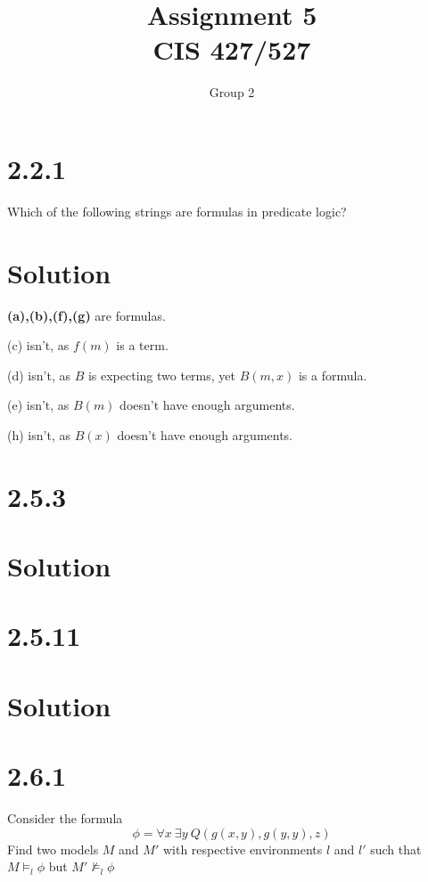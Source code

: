 \documentclass[10pt]{article}
\begin{document}
\title{Assignment \raisebox{.22ex}{\large\#}5 \\
	CIS 427/527}
\author{Group 2}

\maketitle

\section*{2.2.1}
Which of the following strings are formulas in predicate logic?
\section*{Solution}
\textbf{(a),(b),(f),(g)} are formulas.
\begin{description*}
\item[(c)] isn't, as $f(m)$ is a term.
\item[(d)] isn't, as $B$ is expecting two terms, yet $B(m,x)$ is a formula.
\item[(e)] isn't, as $B(m)$ doesn't have enough arguments.
\item[(h)] isn't, as $B(x)$ doesn't have enough arguments.
\end{description*}
\section*{2.5.3}

\section*{Solution}

\section*{2.5.11}

\section*{Solution}

\section*{2.6.1}
Consider the formula
\[
\phi = \forall x\ \exists y\ Q(g(x,y),g(y,y),z)
\]
Find two models $M$ and $M'$ with respective environments $l$ and $l'$ such that $M \models_{l} \phi$ but $M' \not \models_{l} \phi$
\end{document}
